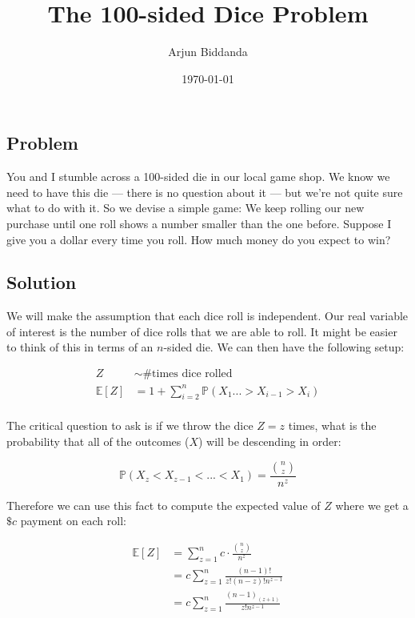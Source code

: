\documentclass[12pt]{article}
\title{The 100-sided Dice Problem}
\author{Arjun Biddanda}
\date{\today}
\begin{document}
\maketitle
\linenumbers

\subsection*{Problem}

You and I stumble across a 100-sided die in our local game shop. We know we need to have this die — there is no question about it — but we’re not quite sure what to do with it. So we devise a simple game: We keep rolling our new purchase until one roll shows a number smaller than the one before. Suppose I give you a dollar every time you roll. How much money do you expect to win?

\subsection*{Solution}

We will make the assumption that each dice roll is independent. Our real variable of interest is the number of dice rolls that we are able to roll. It might be easier to think of this in terms of an $n$-sided die. We can then have the following setup:

\begin{align*}
Z &\sim \text{\# times dice rolled}\\
\mathbb{E}[Z] &= 1 + \sum^n_{i=2} \mathbb{P}(X_1 ... > X_{i-1} > X_i)\\
\end{align*}

The critical question to ask is if we throw the dice $Z = z$ times, what is the probability that all of the outcomes ($X$) will be descending in order:

$$ \mathbb{P}(X_z < X_{z-1} < ... < X_1) = \frac{\binom{n}{z}}{n^z}$$

Therefore we can use this fact to compute the expected value of $Z$ where we get a $\$c$ payment on each roll:

\begin{align*}
\mathbb{E}[Z] &= \sum^n_{z = 1} c \cdot \frac{\binom{n}{z}}{n^z}\\
&= c \sum^n_{z = 1} \frac{(n-1)!}{z!(n-z)!n^{z-1}}\\
&= c \sum^n_{z = 1} \frac{(n-1)_{(z+1)}}{z!n^{z-1}}\\
\end{align*}
\end{document}

